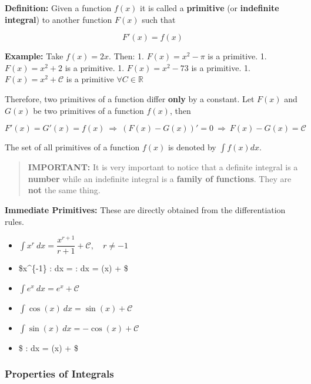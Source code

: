 \documentclass[11pt]{article}
\providecommand{\tightlist}{%
      \setlength{\itemsep}{0pt}\setlength{\parskip}{0pt}}
\begin{document}
\textbf{Definition:} Given a function \(f(x)\) it is called a
\textbf{primitive} (or \textbf{indefinite integral}) to another function
\(F(x)\) such that

\[
F'(x) = f(x)
\]

\textbf{Example:} Take \(f(x) = 2x\). Then: 1. \(F(x) = x^2 - \pi\) is a
primitive. 1. \(F(x) = x^2 + 2\) is a primitive. 1. \(F(x) = x^2 - 73\)
is a primitive. 1. \(F(x) = x^2 + \mathcal{C}\) is a primitive
\(\forall C\in\mathbb{R}\)

Therefore, two primitives of a function differ \textbf{only} by a
constant. Let \(F(x)\) and \(G(x)\) be two primitives of a function
\(f(x)\), then

\[
F'(x) = G'(x) = f(x) \ \Rightarrow \ \left(F(x)-G(x)\right)' = 0 \ \Rightarrow \ F(x) - G(x) = \mathcal{C}
\]

The set of all primitives of a function \(f(x)\) is denoted by
\(\displaystyle\int f(x) dx\).

\begin{quote}
\textbf{IMPORTANT:} It is very important to notice that a definite
integral is a \textbf{number} while an indefinite integral is a
\textbf{family of functions}. They are \textbf{not} the same thing.
\end{quote}

\textbf{Immediate Primitives:} These are directly obtained from the
differentiation rules.

\begin{itemize}
\tightlist
\item
  \(\displaystyle \int x^r \: dx = \dfrac{x^{r+1}}{r+1} + \mathcal{C}, \quad r \neq -1\)
\item
  \$\displaystyle \int x\^{}\{-1\} : dx =
  \displaystyle \int {} : dx = \ln(x) +  \$
\item
  \(\displaystyle \int e^x \: dx = e^x + \mathcal{C}\)
\item
  \(\displaystyle \int \cos(x) \: dx = \sin(x) + \mathcal{C}\)
\item
  \(\displaystyle \int \sin(x) \: dx = -\cos(x) + \mathcal{C}\)
\item
  \$ \displaystyle \int {} : dx = \arctan(x) + 
  \$
\end{itemize}

    \hypertarget{properties-of-integrals}{%
\subsubsection{Properties of Integrals}\label{properties-of-integrals}}
\end{document}
